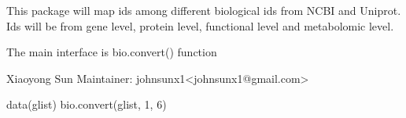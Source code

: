 \begin{Description}\relax
This package will map ids among different biological ids from NCBI and Uniprot. 
Ids will be from gene level, protein level, functional level and metabolomic level.
\end{Description}
\begin{Details}\relax
{}
The main interface is bio.convert() function
\end{Details}
\begin{Author}\relax
Xiaoyong Sun
Maintainer: johnsunx1<johnsunx1@gmail.com>
\end{Author}
\begin{Examples}
\begin{ExampleCode}
data(glist)
bio.convert(glist, 1, 6)
\end{ExampleCode}
\end{Examples}

